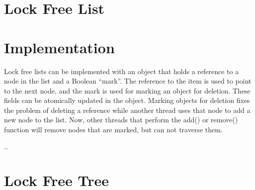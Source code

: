 \documentclass[10pt,a4paper]{article}
\begin{document}

\section{Lock Free List} \section{Implementation} Lock free lists can be
implemented with an object that holds a reference to a node in the list and a
Boolean ``mark''. The reference to the item is used to point to the next node,
and the mark is used for marking an object for deletion. These fields can be
atomically updated in the object. Marking objects for deletion fixes the
problem of deleting a reference while another thread uses that node to add a
new node to the list. Now, other threads that perform the add() or remove() 
function will remove nodes that are marked, but can not traverse them.

..

\section{Lock Free Tree}
\end{document}
